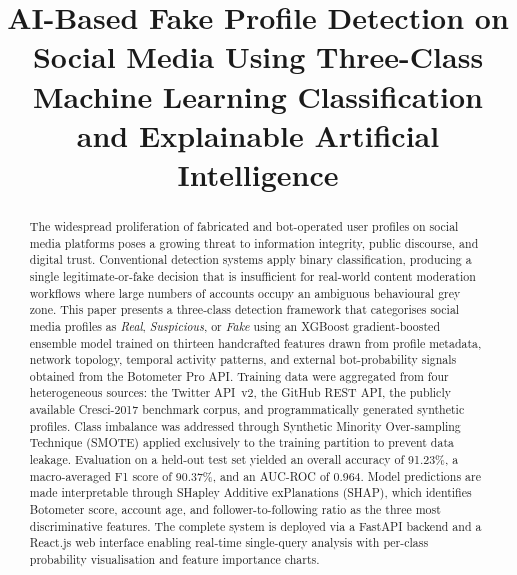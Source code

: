 \documentclass[conference]{IEEEtran}
\begin{document}
\title{AI-Based Fake Profile Detection on Social Media Using
Three-Class Machine Learning Classification and
Explainable Artificial Intelligence}

\author{
  \and
}

\maketitle

\begin{abstract}
The widespread proliferation of fabricated and bot-operated user profiles
on social media platforms poses a growing threat to information integrity,
public discourse, and digital trust. Conventional detection systems apply
binary classification, producing a single legitimate-or-fake decision that
is insufficient for real-world content moderation workflows where large
numbers of accounts occupy an ambiguous behavioural grey zone. This paper
presents a three-class detection framework that categorises social media
profiles as \textit{Real}, \textit{Suspicious}, or \textit{Fake} using an
XGBoost gradient-boosted ensemble model trained on thirteen handcrafted
features drawn from profile metadata, network topology, temporal activity
patterns, and external bot-probability signals obtained from the
Botometer Pro API. Training data were aggregated from four heterogeneous
sources: the Twitter API~v2, the GitHub REST API, the publicly available
Cresci-2017 benchmark corpus, and programmatically generated synthetic
profiles. Class imbalance was addressed through Synthetic Minority
Over-sampling Technique (SMOTE) applied exclusively to the training
partition to prevent data leakage. Evaluation on a held-out test set
yielded an overall accuracy of 91.23\%, a macro-averaged F1 score of
90.37\%, and an AUC-ROC of 0.964. Model predictions are made
interpretable through SHapley Additive exPlanations (SHAP), which
identifies Botometer score, account age, and follower-to-following ratio
as the three most discriminative features. The complete system is deployed
via a FastAPI backend and a React.js web interface enabling real-time
single-query analysis with per-class probability visualisation and
feature importance charts.
\end{abstract}
\end{document}
